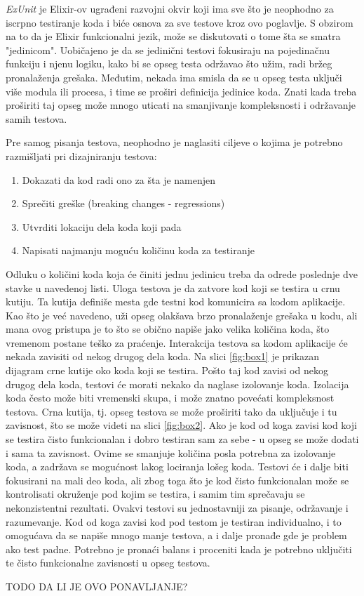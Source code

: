 \documentclass[12pt,oneside]{memoir}
\begin{document}
\textit{ExUnit} je Elixir-ov ugrađeni razvojni okvir koji ima sve što je neophodno za iscrpno testiranje koda i biće osnova za sve testove kroz ovo poglavlje. S obzirom na to da je Elixir funkcionalni jezik, može se diskutovati o tome šta se smatra "jedinicom". Uobičajeno je da se jedinični testovi fokusiraju na pojedinačnu funkciju i njenu logiku, kako bi se opseg testa održavao što užim, radi bržeg pronalaženja grešaka. Međutim, nekada ima smisla da se u opseg testa uključi više modula ili procesa, i time se proširi definicija jedinice koda. Znati kada treba proširiti taj opseg može mnogo uticati na smanjivanje kompleksnosti i održavanje samih testova. 

Pre samog pisanja testova, neophodno je naglasiti ciljeve o kojima je potrebno razmišljati pri dizajniranju testova: 
\begin{enumerate}
\item Dokazati da kod radi ono za šta je namenjen
\item Sprečiti greške (breaking changes - regressions)
\item Utvrditi lokaciju dela koda koji pada
\item Napisati najmanju moguću količinu koda za testiranje
\end{enumerate}

\par Odluku o količini koda koja će činiti jednu jedinicu treba da odrede poslednje dve stavke u navedenoj listi. Uloga testova je da zatvore kod koji se testira u crnu kutiju. Ta kutija definiše mesta gde testni kod komunicira sa kodom aplikacije. Kao što je već navedeno, uži opseg olakšava brzo pronalaženje grešaka u kodu, ali mana ovog pristupa je to što se obično napiše jako velika količina koda, što vremenom postane teško za praćenje. Interakcija testova sa kodom aplikacije će nekada zavisiti od nekog drugog dela koda. Na slici \ref{fig:box1} je prikazan dijagram crne kutije oko koda koji se testira. Pošto taj kod zavisi od nekog drugog dela koda, testovi će morati nekako da naglase izolovanje koda. Izolacija koda često može biti vremenski skupa, i može znatno povećati kompleksnost testova. Crna kutija, tj. opseg testova  se može proširiti tako da uključuje i tu zavisnost, što se može videti na slici \ref{fig:box2}.  Ako je kod od koga zavisi kod koji se testira čisto funkcionalan i dobro testiran sam za sebe - u opseg se može dodati i sama ta zavisnost. Ovime se smanjuje količina posla potrebna za izolovanje koda, a zadržava se mogućnost lakog lociranja lošeg koda. Testovi će i dalje biti fokusirani na mali deo koda, ali zbog toga što je kod čisto funkcionalan može se kontrolisati okruženje pod kojim se testira, i samim tim sprečavaju se nekonzistentni rezultati. Ovakvi testovi su jednostavniji za pisanje, održavanje i razumevanje. Kod od koga zavisi kod pod testom je testiran individualno, i to omogućava da se napiše mnogo manje testova, a i dalje pronađe gde je problem ako test padne. Potrebno je pronaći balans i proceniti kada je potrebno uključiti te čisto funkcionalne zavisnosti u opseg testova. 
\par TODO DA LI JE OVO PONAVLJANJE?
\end{document}
